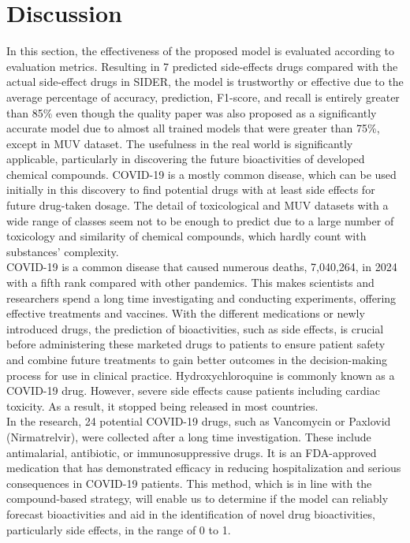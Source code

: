\documentclass[conference]{IEEEtran}
\begin{document}
\section{Discussion}
In this section, the effectiveness of the proposed model is evaluated according to evaluation metrics. Resulting in 7 predicted side-effects drugs compared with the actual side-effect drugs in SIDER, the model is trustworthy or effective due to the average percentage of accuracy, prediction, F1-score, and recall is entirely greater than 85\% even though the quality paper was also proposed as a significantly accurate model due to almost all trained models that were greater than 75\%, except in MUV dataset. The usefulness in the real world is significantly applicable, particularly in discovering the future bioactivities of developed chemical compounds. COVID-19 is a mostly common disease, which can be used initially in this discovery to find potential drugs with at least side effects for future drug-taken dosage. The detail of toxicological and MUV datasets with a wide range of classes seem not to be enough to predict due to a large number of toxicology and similarity of chemical compounds, which hardly count with substances’ complexity. \\

COVID-19 is a common disease that caused numerous deaths, 7,040,264, in 2024 with a fifth rank compared with other pandemics. This makes scientists and researchers spend a long time investigating and conducting experiments, offering effective treatments and vaccines. With the different medications or newly introduced drugs, the prediction of bioactivities, such as side effects, is crucial before administering these marketed drugs to patients to ensure patient safety and combine future treatments to gain better outcomes in the decision-making process for use in clinical practice. Hydroxychloroquine is commonly known as a COVID-19 drug. However, severe side effects cause patients including cardiac toxicity. As a result, it stopped being released in most countries.\\

In the research, 24 potential COVID-19 drugs, such as Vancomycin or Paxlovid (Nirmatrelvir),  were collected after a long time investigation. These include antimalarial, antibiotic, or immunosuppressive drugs. It is an FDA-approved medication that has demonstrated efficacy in reducing hospitalization and serious consequences in COVID-19 patients. This method, which is in line with the compound-based strategy, will enable us to determine if the model can reliably forecast bioactivities and aid in the identification of novel drug bioactivities, particularly side effects, in the range of 0 to 1. \\
\end{document}
